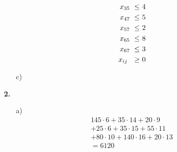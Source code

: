 \documentclass [a4paper,11pt]{article}
\begin{document}
\begin{enumerate}
\begin{enumerate}
\begin{align*}
\begin{alignedat}{8}
                &&&&        &    &         &    &         &    &\ x_{35} &\ \leq &\ 4 \\
                &&&&        &    &         &    &         &    &\ x_{47} &\ \leq &\ 5 \\
                &&&&        &    &         &    &         &    &\ x_{57} &\ \leq &\ 2 \\
                &&&&        &    &         &    &         &    &\ x_{65} &\ \leq &\ 8 \\
                &&&&        &    &         &    &         &    &\ x_{67} &\ \leq &\ 3 \\
                &&&&        &    &         &    & & & \llap{ $ x_{ij} $ } &\ \geq &\ 0
                \end{alignedat}
                \end{align*}

            \item[c)]

        \end{enumerate}

        \item[\textbf{2.}]
        \begin{enumerate}
            \item[a)]
                \begin{align*}
                145 \cdot 6 + 35 \cdot 14 + 20 \cdot 9 \\
                + 25 \cdot 6 + 35 \cdot 15 + 55 \cdot 11 \\
                + 80 \cdot 10 + 140 \cdot 16 + 20 \cdot 13 \\
                =6120
                \end{align*}


\end{enumerate}
\end{enumerate}
\end{document}
